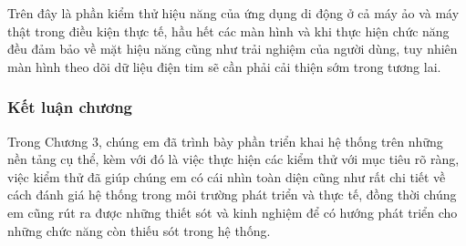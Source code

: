 Trên đây là phần kiểm thử hiệu năng của ứng dụng di động ở cả máy ảo và máy thật trong điều kiện thực tế, hầu hết các màn hình
và khi thực hiện chức năng đều đảm bảo về mặt hiệu năng cũng như trải nghiệm của người dùng, tuy nhiên màn hình theo dõi
dữ liệu điện tim sẽ cần phải cải thiện sớm trong tương lai.

\subsubsection{Kết luận chương}
  Trong Chương 3, chúng em đã trình bày phần triển khai hệ thống trên những nền tảng cụ thể, kèm với đó là việc thực hiện
  các kiểm thử với mục tiêu rõ ràng, việc kiểm thử đã giúp chúng em có cái nhìn toàn diện cũng như rất chi tiết về cách đánh giá 
  hệ thống trong môi trường phát triển và thực tế, đồng thời chúng em cũng rút ra được những thiết sót và kinh nghiệm
  để có hướng phát triển cho những chức năng còn thiếu sót trong hệ thống.
\newpage
